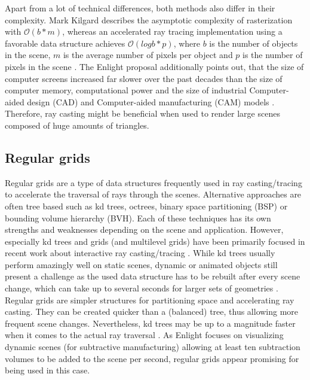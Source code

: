 Apart from a lot of technical differences, both methods also differ in their complexity. Mark Kilgard describes the asymptotic complexity of rasterization with $\mathcal{O}(b * m)$, whereas an accelerated ray tracing implementation using a favorable data structure achieves $\mathcal{O}(log b * p)$, where $b$ is the number of objects in the scene, $m$ is the average number of pixels per object and $p$ is the number of pixels in the scene \cite[p.48]{ray_casting_presentation}. The Enlight proposal additionally points out, that the size of computer screens increased far slower over the past decades than the size of computer memory, computational power and the size of industrial Computer-aided design (CAD) and Computer-aided manufacturing (CAM) models \cite{enlight_proposal}. Therefore, ray casting might be beneficial when used to render large scenes composed of huge amounts of triangles.


\subsection{Regular grids}
\label{sec:regular_grids}

Regular grids are a type of data structures frequently used in ray casting/tracing to accelerate the traversal of rays through the scenes. Alternative approaches are often tree based such as kd trees, octrees, binary space partitioning (BSP) or bounding volume hierarchy (BVH). Each of these techniques has its own strengths and weaknesses depending on the scene and application. However, especially kd trees and grids (and multilevel grids) have been primarily focused in recent work about interactive ray casting/tracing \cite[ch.1]{packet_caster}. While kd trees usually perform amazingly well on static scenes, dynamic or animated objects still present a challenge as the used data structure has to be rebuilt after every scene change, which can take up to several seconds for larger sets of geometries \cite[ch.1]{packet_caster}. Regular grids are simpler structures for partitioning space and accelerating ray casting. They can be created quicker than a (balanced) tree, thus allowing more frequent scene changes. Nevertheless, kd trees may be up to a magnitude faster when it comes to the actual ray traversal \cite[ch.1]{packet_caster}. As Enlight focuses on visualizing dynamic scenes (for subtractive manufacturing) allowing at least ten subtraction volumes to be added to the scene per second, regular grids appear promising for being used in this case.

